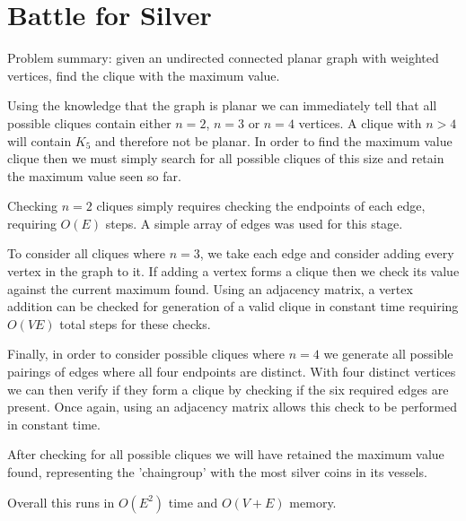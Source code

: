 \section{Battle for Silver}

Problem summary: given an undirected connected planar graph with weighted vertices, 
find the clique with the maximum value.

Using the knowledge that the graph is planar we can immediately tell that all
possible cliques contain either $n=2$, $n=3$ or $n=4$ vertices. A clique with
$n>4$ will contain $K_5$ and therefore not be planar. In order to find the 
maximum value clique then we must simply search for all possible cliques of 
this size and retain the maximum value seen so far. 

Checking $n=2$ cliques simply requires checking the endpoints of each edge, 
requiring $O(E)$ steps. A simple array of edges was used for this stage. 

To consider all cliques where $n=3$, we take each edge and consider adding 
every vertex in the graph to it. If adding a vertex forms a clique then we 
check its value against the current maximum found. Using an adjacency matrix, 
a vertex addition can be checked for generation of a valid clique in constant 
time requiring $O(VE)$ total steps for these checks.

Finally, in order to consider possible cliques where $n=4$ we generate all
possible pairings of edges where all four endpoints are distinct. With four
distinct vertices we can then verify if they form a clique by checking if
the six required edges are present. Once again, using an adjacency matrix
allows this check to be performed in constant time. 

After checking for all possible cliques we will have retained the maximum
value found, representing the 'chaingroup' with the most silver coins in
its vessels.

Overall this runs in $O(E^2)$ time and $O(V + E)$ memory.
